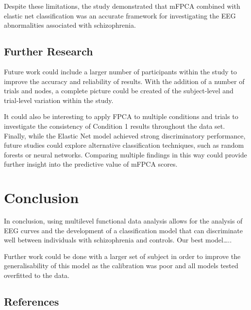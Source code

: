 \documentclass{article}
\begin{document}
Despite these limitations, the study demonstrated that mFPCA combined
with elastic net classification was an accurate framework for
investigating the EEG abnormalities associated with schizophrenia.

\subsection{Further Research}\label{further-research}

Future work could include a larger number of participants within the
study to improve the accuracy and reliability of results. With the
addition of a number of trials and nodes, a complete picture could be
created of the subject-level and trial-level variation within the study.

It could also be interesting to apply FPCA to multiple conditions and
trials to investigate the consistency of Condition 1 results throughout
the data set. Finally, while the Elastic Net model achieved strong
discriminatory performance, future studies could explore alternative
classification techniques, such as random forests or neural networks.
Comparing multiple findings in this way could provide further insight
into the predictive value of mFPCA scores.

\section{Conclusion}\label{conclusion}

In conclusion, using multilevel functional data analysis allows for the
analysis of EEG curves and the development of a classification model
that can discriminate well between individuals with schizophrenia and
controls. Our best model\ldots..

Further work could be done with a larger set of subject in order to
improve the generalisability of this model as the calibration was poor
and all models tested overfitted to the data.

\subsection*{References}\label{references}
\end{document}
